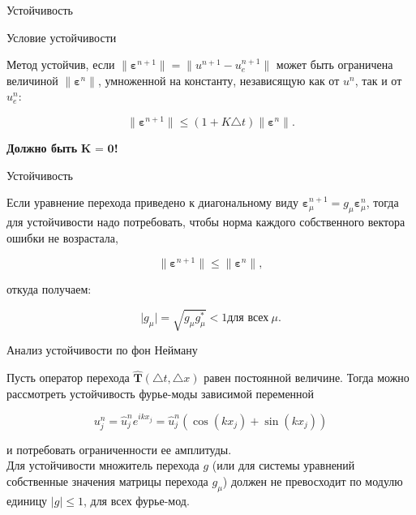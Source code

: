 \documentclass[10pt,xcolor=pst,aspectratio=169]{beamer}
\begin{document}
\begin{frame}{Устойчивость}

	\transdissolve[duration=0.1]
	\justifying
	\large

	\begin{block}{Условие устойчивости}

		Метод устойчив, если $\parallel \bm{\varepsilon}^{n + 1} \parallel = \parallel u^{n + 1} - u^{n + 1}_{e} \parallel$ может быть ограничена величиной $\parallel \bm{\varepsilon}^{n} \parallel$, умноженной на константу, независящую как от $u^{n}$, так и от $ u^{n}_{e}$:

		\[
			\parallel \bm{\varepsilon}^{n + 1} \parallel \leq \left( 1 + K \triangle t \right) \parallel \bm{\varepsilon}^{n} \parallel.
		\]

	\end{block}

	\begin{center}
	    \textbf{Должно быть} $\textbf{K = 0}$\textbf{!}
	\end{center}

\end{frame}

\begin{frame}{Устойчивость}

	\transdissolve[duration=0.1]
	\justifying
	\large

	Если уравнение перехода приведено к диагональному виду $\bm{\varepsilon}^{n + 1}_{\mu} = g_{\mu} \bm{\varepsilon}^{n}_{\mu}$, тогда для устойчивости надо потребовать, чтобы норма каждого собственного вектора ошибки не возрастала,

    \[
        \parallel \bm{\varepsilon}^{n + 1} \parallel \leq \parallel \bm{\varepsilon}^{n} \parallel ,
    \]
	
	откуда получаем:

	\[
		\vert g_{\mu} \vert = \sqrt{ g_{\mu}  g^{*}_{\mu}} < 1 \mbox{для всех} \: \mu.
	\]

\end{frame}

\begin{frame}{Анализ устойчивости по фон Нейману}

	\transdissolve[duration=0.1]
	\justifying
	\large

	Пусть оператор перехода $\hat{\textbf{T}} (\triangle t, \triangle x)$ равен постоянной величине. Тогда можно рассмотреть устойчивость фурье-моды зависимой переменной

    \[
        u^{n}_{j} = \hat{u}^{n}_{j} e^{i k x_{j}} = \hat{u}^{n}_{j} \left( \cos \left( k x_{j} \right) + \sin \left( k x_{j} \right) \right)
    \]

	и потребовать ограниченности ее амплитуды. \\

	Для устойчивости множитель перехода $g$ (или для системы уравнений собственные значения матрицы перехода $g_{\mu}$) должен не превосходит по модулю единицу $\vert g \vert \leq 1$, для всех фурье-мод.\\

\end{frame}
\end{document}
